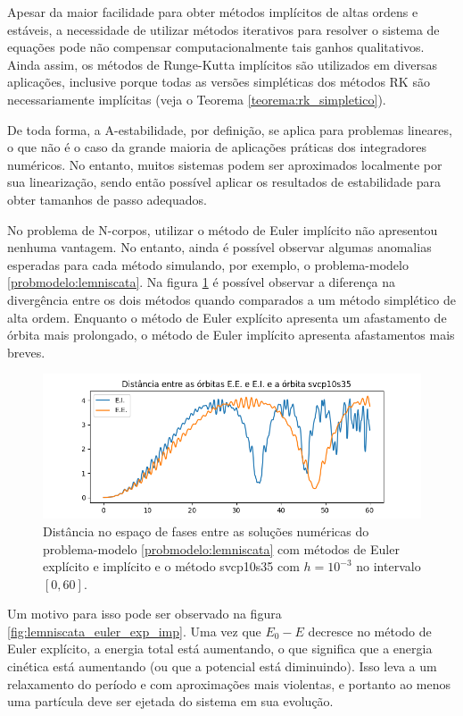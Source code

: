 Apesar da maior facilidade para obter métodos implícitos de altas ordens e estáveis, a necessidade de utilizar métodos iterativos para resolver o sistema de equações pode não compensar computacionalmente tais ganhos qualitativos. Ainda assim, os métodos de Runge-Kutta implícitos são utilizados em diversas aplicações, inclusive porque todas as versões simpléticas dos métodos RK são necessariamente implícitas (veja o Teorema \ref{teorema:rk_simpletico}).

De toda forma, a A-estabilidade, por definição, se aplica para problemas lineares, o que não é o caso da grande maioria de aplicações práticas dos integradores numéricos. No entanto, muitos sistemas podem ser aproximados localmente por sua linearização, sendo então possível aplicar os resultados de estabilidade para obter tamanhos de passo adequados.

No problema de N-corpos, utilizar o método de Euler implícito não apresentou nenhuma vantagem. No entanto, ainda é possível observar algumas anomalias esperadas para cada método simulando, por exemplo, o problema-modelo \ref{probmodelo:lemniscata}. Na figura \ref{fig:lemniscata_euler_exp_imp_distancia} é possível observar a diferença na divergência entre os dois métodos quando comparados a um método simplético de alta ordem. Enquanto o método de Euler explícito apresenta um afastamento de órbita mais prolongado, o método de Euler implícito apresenta afastamentos mais breves.

\begin{figure}
    \centering
    \includegraphics[width=0.75\linewidth]{tcc//img/lemniscata_euler_exp_imp_svcp10s35.png}
    \caption{Distância no espaço de fases entre as soluções numéricas do problema-modelo \ref{probmodelo:lemniscata} com métodos de Euler explícito e implícito e o método svcp10s35 com $h=10^{-3}$ no intervalo $[0,60]$.}
    \label{fig:lemniscata_euler_exp_imp_distancia}
\end{figure}

Um motivo para isso pode ser observado na figura \ref{fig:lemniscata_euler_exp_imp}. Uma vez que $E_0 - E$ decresce no método de Euler explícito, a energia total está aumentando, o que significa que a energia cinética está aumentando (ou que a potencial está diminuindo). Isso leva a um relaxamento do período e com aproximações mais violentas, e portanto ao menos uma partícula deve ser ejetada do sistema em sua evolução.


